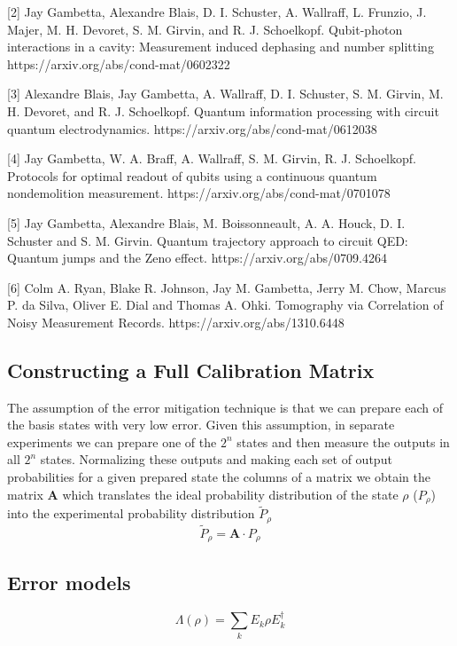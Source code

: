 \documentclass[11pt, oneside]{article}   	%
\begin{document}
[2] Jay Gambetta, Alexandre Blais, D. I. Schuster, A. Wallraff, L. Frunzio, J. Majer, M. H. Devoret, S. M. Girvin, and R. J. Schoelkopf. Qubit-photon interactions in a cavity: Measurement induced dephasing and number splitting https://arxiv.org/abs/cond-mat/0602322

[3] Alexandre Blais, Jay Gambetta, A. Wallraff, D. I. Schuster, S. M. Girvin, M. H. Devoret, and R. J. Schoelkopf. Quantum information processing with circuit quantum electrodynamics. https://arxiv.org/abs/cond-mat/0612038

[4] Jay Gambetta, W. A. Braff, A. Wallraff, S. M. Girvin, R. J. Schoelkopf. Protocols for optimal readout of qubits using a continuous quantum nondemolition measurement. https://arxiv.org/abs/cond-mat/0701078

[5] Jay Gambetta, Alexandre Blais, M. Boissonneault, A. A. Houck, D. I. Schuster and S. M. Girvin. Quantum trajectory approach to circuit QED: Quantum jumps and the Zeno effect. https://arxiv.org/abs/0709.4264

[6] Colm A. Ryan, Blake R. Johnson, Jay M. Gambetta, Jerry M. Chow, Marcus P. da Silva, Oliver E. Dial and Thomas A. Ohki. Tomography via Correlation of Noisy Measurement Records. https://arxiv.org/abs/1310.6448

\subsection{Constructing a Full Calibration Matrix}
The assumption of the error mitigation technique is that we can prepare each of the basis states with very low error. Given this assumption, in separate experiments we can prepare one of the $2^n$ states and then measure the outputs in all $2^n$ states. Normalizing these outputs and making each set of output probabilities for a given prepared state the columns of a matrix we obtain the matrix $\mathbf{A}$ which translates the ideal probability distribution of the state $\rho$ ($P_\rho$) into the experimental probability distribution $\tilde{P}_{\rho}$ 
\begin{equation}
\tilde{P}_{\rho} = \mathbf{A} \cdot P_{\rho}
\end{equation}

\subsection{Error models}
\begin{equation}
\Lambda(\rho) = \sum_k E_k \rho E^{\dagger}_k
\end{equation}
\end{document}
